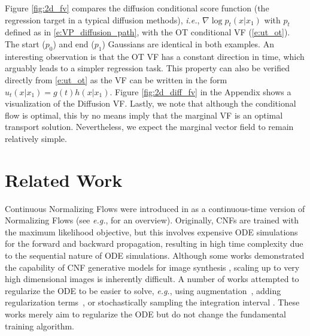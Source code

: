 \documentclass{article}
\makeatletter
\renewcommand*{\eg}{{\it e.g.}\@\xspace}
\renewcommand*{\ie}{{\it i.e.}\@\xspace}
\makeatother
\begin{document}
Figure \ref{fig:2d_fv} compares the diffusion conditional score function (the regression target in a typical diffusion methods), \ie, $\nabla \log p_t(x|x_1)$ with $p_t$ defined as in \eqref{e:VP_diffusion_path}, with the OT conditional VF (\eqref{e:ut_ot}). 
The start ($p_0$) and end ($p_1$) Gaussians are identical in both examples. 
An interesting observation is that the OT VF has a constant direction in time, which arguably leads to a simpler regression task. This property can also be verified directly from \eqref{e:ut_ot} as the VF can be written in the form $u_t(x|x_1)=g(t)h(x|x_1)$. Figure \ref{fig:2d_diff_fv} in the Appendix shows a visualization of the Diffusion VF. 
%
Lastly, we note that although the conditional flow is optimal, this by no means imply that the marginal VF is an optimal transport solution. Nevertheless, we expect the marginal vector field to remain relatively simple.



\section{Related Work}

Continuous Normalizing Flows were introduced in \citep{chen2018neural} as a continuous-time version of Normalizing Flows (see \eg, \citet{kobyzev2020normalizing,papamakarios2021normalizing} for an overview). Originally, CNFs are trained with the maximum likelihood objective, but this involves expensive ODE simulations for the forward and backward propagation, resulting in high time complexity due to the sequential nature of ODE simulations. Although some works demonstrated the capability of CNF generative models for image synthesis \citep{ffjord2018}, scaling up to very high dimensional images is inherently difficult. %
%
A number of works attempted to regularize the ODE to be easier to solve, \eg, using augmentation~\citep{dupont2019aug}, adding regularization terms~\citep{yang2019potential,finlay2020how,onken2021ot-flow,tong2020trajectorynet,kelly2020learning}, or stochastically sampling the integration interval \citep{du2022toflow}. These works merely aim to regularize the ODE but do not change the fundamental training algorithm.
\end{document}
